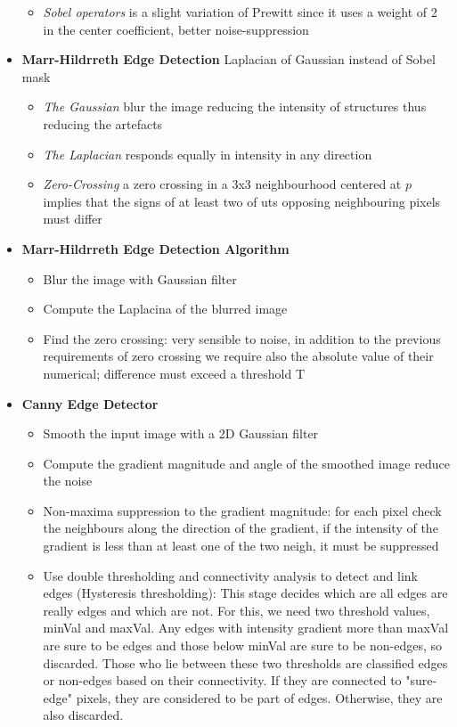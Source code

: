 \documentclass{article}
\begin{document}
\begin{itemize}
\begin{itemize}
        \item \textit{Sobel operators} is a slight variation of Prewitt since it uses a weight of 2 in the center coefficient, better noise-suppression 
    \end{itemize}
    \item \textbf{Marr-Hildrreth Edge Detection} Laplacian of Gaussian instead of Sobel mask\
    \begin{itemize}
        \item \textit{The Gaussian} blur the image reducing the intensity of structures thus reducing the artefacts
        \item \textit{The Laplacian} responds equally in intensity in any direction
        \item \textit{Zero-Crossing} a zero crossing in a 3x3 neighbourhood centered at \(p\) implies that the signs of at least two of uts opposing neighbouring pixels must differ
    \end{itemize}
    \item \textbf{Marr-Hildrreth Edge Detection Algorithm}
    \begin{itemize}
        \item Blur the image with Gaussian filter
        \item Compute the Laplacina of the blurred image
        \item Find the zero crossing: very sensible to noise, in addition to the previous requirements of zero crossing we require also the absolute value of their numerical; difference must exceed a threshold T
    \end{itemize}

    \item \textbf{Canny Edge Detector}
    \begin{itemize}
        \item Smooth the input image with a 2D Gaussian filter
        \item Compute the gradient magnitude and angle of the smoothed image reduce the noise
        \item Non-maxima suppression to the gradient magnitude: for each pixel check the neighbours along the direction of the gradient, if the intensity of the gradient is less than at least one of the two neigh, it must be suppressed
        \item Use double thresholding and connectivity analysis to detect and link edges (Hysteresis thresholding): This stage decides which are all edges are really edges and which are not. For this, we need two threshold values, minVal and maxVal. Any edges with intensity gradient more than maxVal are sure to be edges and those below minVal are sure to be non-edges, so discarded. Those who lie between these two thresholds are classified edges or non-edges based on their connectivity. If they are connected to "sure-edge" pixels, they are considered to be part of edges. Otherwise, they are also discarded.
    \end{itemize}



\end{itemize}
\end{document}
